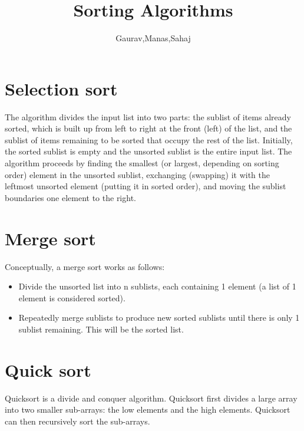 \documentclass{IEEEtran}
\author{Gaurav,Manas,Sahaj}
\title{Sorting Algorithms}
\begin{document}
\maketitle


\section{Selection sort}
\begin{flushleft}
The algorithm divides the input list into two parts: \newline
the sublist of items already sorted, which is built up from left to right at the front (left) of the list, and the sublist of items remaining to be sorted that occupy the rest of the list. \newline Initially, the sorted sublist is empty and the unsorted sublist is the entire input list. \newline The algorithm proceeds by finding the smallest (or largest, depending on sorting order) element in the unsorted sublist, exchanging (swapping) it with the leftmost unsorted element (putting it in sorted order), and moving the sublist boundaries one element to the right.
\end{flushleft}

\section{Merge sort}
\begin{flushleft}
Conceptually, a merge sort works as follows:
\begin{itemize}
\item Divide the unsorted list into n sublists, each containing 1 element (a list of 1 element is considered sorted).
\item Repeatedly merge sublists to produce new sorted sublists until there is only 1 sublist remaining. This will be the sorted list.
\end{itemize}
\end{flushleft}

\section{Quick sort}
\begin{flushleft}
Quicksort is a divide and conquer algorithm. Quicksort first divides a large array into two smaller sub-arrays: the low elements and the high elements. Quicksort can then recursively sort the sub-arrays. \newline
\end{flushleft}
\end{document}
